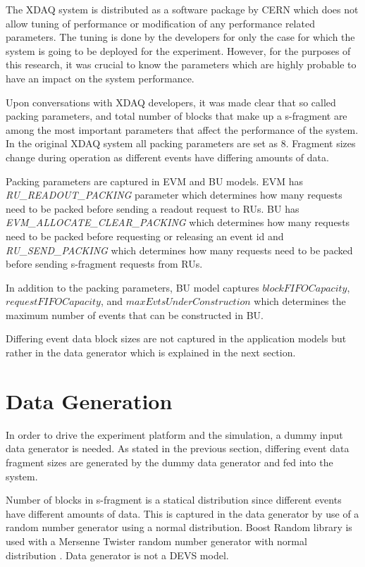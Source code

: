 The XDAQ system is distributed as a software package by CERN which does not allow tuning of performance or modification of any performance related parameters. The tuning is done by the developers for only the case for which the system is going to be deployed for the experiment. However, for the purposes of this research, it was crucial to know the parameters which are highly probable to have an impact on the system performance. 

Upon conversations with XDAQ developers, it was made clear that so called packing parameters, and total number of blocks that make up a s-fragment are among the most important parameters that affect the performance of the system. In the original XDAQ system all packing parameters are set as $8$. Fragment sizes change during operation as different events have differing amounts of data. 

Packing parameters are captured in EVM and BU models. EVM has \textit{RU\_READOUT\_PACKING} parameter which determines how many requests need to be packed before sending a readout request to RUs. BU has \textit{EVM\_ALLOCATE\_CLEAR\_PACKING} which determines how many requests need to be packed before requesting or releasing an event id  and \textit{RU\_SEND\_PACKING} which determines how many requests need to be packed before sending s-fragment requests from RUs.

In addition to the packing parameters, BU model captures $blockFIFOCapacity$, $requestFIFOCapacity$, and $maxEvtsUnderConstruction$ which determines the maximum number of events that can be constructed in BU.

Differing event data block sizes are not captured in the application models but rather in the data generator which is explained in the next section. 

\section{Data Generation}
In order to drive the experiment platform and the simulation, a dummy input data generator is needed. As stated in the previous section, differing event data fragment sizes are generated by the dummy data generator and fed into the system. 

Number of blocks in s-fragment is a statical distribution since different events have different amounts of data. This is captured in the data generator by use of a random number generator using a normal distribution. Boost Random library is used with a Mersenne Twister random number generator with normal distribution \cite{boost}. Data generator is not a DEVS model. 



